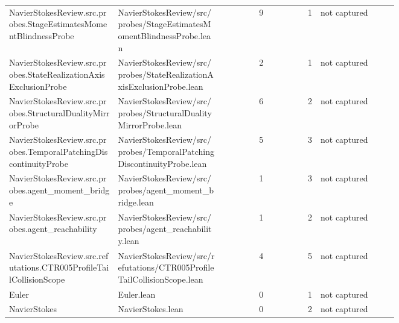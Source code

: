 \documentclass[10pt]{article}
\begin{document}
\begin{longtable}{p{0.28\linewidth}p{0.27\linewidth}r r p{0.20\linewidth}}
NavierStokesReview.src.probes.StageEstimatesMomentBlindnessProbe & NavierStokesReview/src/probes/StageEstimatesMomentBlindnessProbe.lean & 9 & 1 & not captured\\
NavierStokesReview.src.probes.StateRealizationAxisExclusionProbe & NavierStokesReview/src/probes/StateRealizationAxisExclusionProbe.lean & 2 & 1 & not captured\\
NavierStokesReview.src.probes.StructuralDualityMirrorProbe & NavierStokesReview/src/probes/StructuralDualityMirrorProbe.lean & 6 & 2 & not captured\\
NavierStokesReview.src.probes.TemporalPatchingDiscontinuityProbe & NavierStokesReview/src/probes/TemporalPatchingDiscontinuityProbe.lean & 5 & 3 & not captured\\
NavierStokesReview.src.probes.agent\_moment\_bridge & NavierStokesReview/src/probes/agent\_moment\_bridge.lean & 1 & 3 & not captured\\
NavierStokesReview.src.probes.agent\_reachability & NavierStokesReview/src/probes/agent\_reachability.lean & 1 & 2 & not captured\\
NavierStokesReview.src.refutations.CTR005ProfileTailCollisionScope & NavierStokesReview/src/refutations/CTR005ProfileTailCollisionScope.lean & 4 & 5 & not captured\\
Euler & Euler.lean & 0 & 1 & not captured\\
NavierStokes & NavierStokes.lean & 0 & 2 & not captured\\
\bottomrule\end{longtable}
\end{document}
